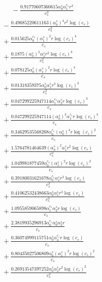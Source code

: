 \documentclass[10pt]{article}
\begin{document}
\begin{align*}
\phantom{R_{1,6}} &\phantom{={}}{}  - \frac{0.91770607360615 \alpha_{0}^s \alpha_{1}^{c_s} r^{3}}{c_{s}^{3}} \\
&{}  - \frac{0.49685220611163 \left(\alpha_{0}^s\right)^{4} r^{2} \log{\left(c_{s} \right)}}{c_{s}^{2}} \\
&{}  + \frac{0.015625 \alpha_{0}^{c_s} \left(\alpha_{1}^s\right)^{2} r \log{\left(c_{s} \right)}^{4}}{c_{s}} \\
&{}  + \frac{0.1875 \left(\alpha_{0}^s\right)^{2} \alpha_{1}^s r^{2} \log{\left(c_{s} \right)}^{3}}{c_{s}^{2}} \\
&{}  + \frac{0.078125 \alpha_{0}^s \left(\alpha_{1}^s\right)^{2} r \log{\left(c_{s} \right)}^{4}}{c_{s}} \\
&{}  + \frac{0.01318359375 \alpha_{0}^s \alpha_{1}^s r^{3} \log{\left(c_{s} \right)}^{3}}{c_{s}^{3}} \\
&{}  + \frac{0.047299225947114 \alpha_{1}^{c_s} \alpha_{2}^s r \log{\left(c_{s} \right)}^{3}}{c_{s}} \\
&{}  + \frac{0.047299225947114 \left(\alpha_{0}^s\right)^{3} \alpha_{1}^{c_s} r \log{\left(c_{s} \right)}^{3}}{c_{s}} \\
&{}  + \frac{0.34629535568268 \alpha_{0}^{c_s} \left(\alpha_{0}^s\right)^{4} r \log{\left(c_{s} \right)}^{2}}{c_{s}} \\
&{}  + \frac{1.5764781464639 \left(\alpha_{0}^s\right)^{2} \alpha_{1}^s r^{2} \log{\left(c_{s} \right)}}{c_{s}^{2}} \\
&{}  + \frac{1.049981877459 \alpha_{0}^{c_s} \left(\alpha_{1}^s\right)^{2} r \log{\left(c_{s} \right)}^{2}}{c_{s}} \\
&{}  + \frac{0.39180031621678 \alpha_{0}^{c_s} \alpha_{1}^s r^{3} \log{\left(c_{s} \right)}}{c_{s}^{3}} \\
&{}  + \frac{0.41062532438663 \alpha_{0}^s \alpha_{1}^s r^{3} \log{\left(c_{s} \right)}}{c_{s}^{3}} \\
&{}  + \frac{1.0955859065898 \alpha_{1}^{c_s} \alpha_{2}^s r \log{\left(c_{s} \right)}}{c_{s}} \\
&{}  + \frac{2.3819935296913 \alpha_{0}^{c_s} \alpha_{0}^s \alpha_{2}^s r}{c_{s}} \\
&{}  + \frac{0.36074999115751 \alpha_{0}^s \alpha_{3}^{c_s} r \log{\left(c_{s} \right)}}{c_{s}} \\
&{}  + \frac{0.80435027506809 \alpha_{0}^s \left(\alpha_{1}^s\right)^{2} r \log{\left(c_{s} \right)}^{2}}{c_{s}} \\
&{}  + \frac{0.26913547397252 \alpha_{0}^s \alpha_{2}^s r^{2} \log{\left(c_{s} \right)}^{2}}{c_{s}^{2}} \\

\end{align*}
\end{document}
